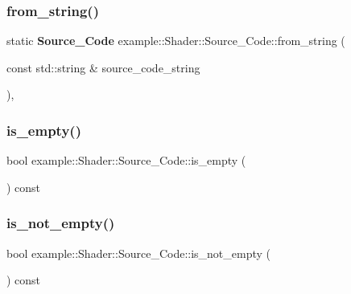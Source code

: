 \mbox{\label{classexample_1_1_shader_1_1_source___code_a3f8055dfc7cd546d51927c5a1b1795cc}} 
\subsubsection{from\_string()}
{\footnotesize\ttfamily static \textbf{ Source\+\_\+\+Code} example\+::\+Shader\+::\+Source\+\_\+\+Code\+::from\+\_\+string (\begin{DoxyParamCaption}\item[{const std\+::string \&}]{source\+\_\+code\+\_\+string }\end{DoxyParamCaption})\hspace{0.3cm}{\ttfamily [inline]}, {\ttfamily [static]}}

\mbox{\label{classexample_1_1_shader_1_1_source___code_ab3ffac64d2530fbd4fe51b9c7835afda}} 
\subsubsection{is\_empty()}
{\footnotesize\ttfamily bool example\+::\+Shader\+::\+Source\+\_\+\+Code\+::is\+\_\+empty (\begin{DoxyParamCaption}{ }\end{DoxyParamCaption}) const\hspace{0.3cm}{\ttfamily [inline]}}

\mbox{\label{classexample_1_1_shader_1_1_source___code_a316341560e88e77b03b1a7e0cdcaff57}} 
\subsubsection{is\_not\_empty()}
{\footnotesize\ttfamily bool example\+::\+Shader\+::\+Source\+\_\+\+Code\+::is\+\_\+not\+\_\+empty (\begin{DoxyParamCaption}{ }\end{DoxyParamCaption}) const\hspace{0.3cm}{\ttfamily [inline]}}

